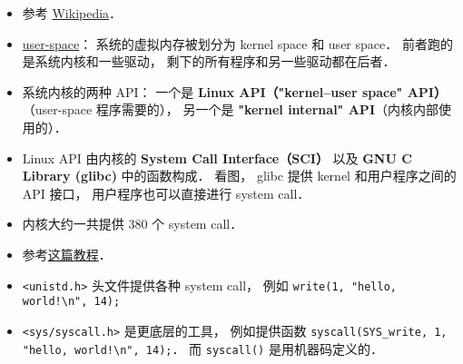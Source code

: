 
\begin{issues}
\issueDraft
\end{issues}

\begin{itemize}
\item 参考 \href{https://en.wikipedia.org/wiki/Linux_kernel_interfaces}{Wikipedia}．
\item \href{https://en.wikipedia.org/wiki/User_space_and_kernel_space}{user-space}： 系统的虚拟内存被划分为 kernel space 和 user space． 前者跑的是系统内核和一些驱动， 剩下的所有程序和另一些驱动都在后者．
\item 系统内核的两种 API： 一个是 \textbf{Linux API（"kernel–user space" API）}（user-space 程序需要的）， 另一个是 \textbf{"kernel internal" API}（内核内部使用的）．
\item Linux API 由内核的 \textbf{System Call Interface（SCI）} 以及 \textbf{GNU C Library (glibc)} 中的函数构成． 看图， glibc 提供 kernel 和用户程序之间的 API 接口， 用户程序也可以直接进行 system call．
\item 内核大约一共提供 380 个 system call．
\item 参考\href{https://jameshfisher.com/2018/02/19/how-to-syscall-in-c/}{这篇教程}．
\item \verb|<unistd.h>| 头文件提供各种 system call， 例如 \verb|write(1, "hello, world!\n", 14);|
\item \verb|<sys/syscall.h>| 是更底层的工具， 例如提供函数 \verb|syscall(SYS_write, 1, "hello, world!\n", 14);|． 而 \verb|syscall()| 是用机器码定义的．
\end{itemize}
